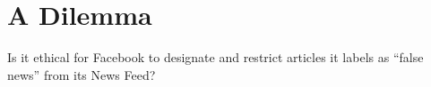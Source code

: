 
\section{A Dilemma}

Is it ethical for Facebook to designate and restrict articles it labels as ``false news'' from its News Feed?